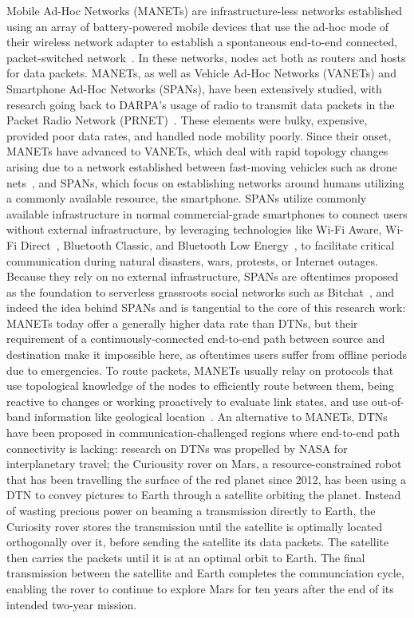Mobile Ad-Hoc Networks (MANETs) are infrastructure-less networks established using an array of battery-powered mobile devices that use the ad-hoc mode of their wireless network adapter to establish a spontaneous end-to-end connected, packet-switched network~\cite{Liu2026, Kindt2018}.
In these networks, nodes act both as routers and hosts for data packets.
MANETs, as well as Vehicle Ad-Hoc Networks (VANETs) and Smartphone Ad-Hoc Networks (SPANs), have been extensively studied, with research going back to DARPA's usage of radio to transmit data packets in the Packet Radio Network (PRNET)~\cite{Stotts2008}. These elements were bulky, expensive, provided poor data rates, and handled node mobility poorly.
Since their onset, MANETs have advanced to VANETs, which deal with rapid topology changes arising due to a network established between fast-moving vehicles such as drone nets~\cite{Liu2026}, and SPANs, which focus on establishing networks around humans utilizing a commonly available resource, the smartphone.
SPANs utilize commonly available infrastructure in normal commercial-grade smartphones to connect users without external infrastructure, by leveraging technologies like Wi-Fi Aware, Wi-Fi Direct~\cite{wifi-aware}, Bluetooth Classic, and Bluetooth Low Energy~\cite{bt-spec}, to facilitate critical communication during natural disasters, wars, protests, or Internet outages.
Because they rely on no external infrastructure, SPANs are oftentimes proposed as the foundation to serverless grassroots social networks such as Bitchat~\cite{bitchat}, and indeed the idea behind SPANs and is tangential to the core of this research work: MANETs today offer a generally higher data rate than DTNs, but their requirement of a continuously-connected end-to-end path between source and destination make it impossible here, as oftentimes users suffer from offline periods due to emergencies.
To route packets, MANETs usually relay on protocols that use topological knowledge of the nodes to efficiently route between them, being reactive to changes or working proactively to evaluate link states, and use out-of-band information like geological location~\cite{CMB-MANET}.
An alternative to MANETs, DTNs have been proposed in communication-challenged regions where end-to-end path connectivity is lacking: research on DTNs was propelled by NASA for interplanetary travel; the Curiousity rover on Mars, a resource-constrained robot that has been travelling the surface of the red planet since 2012, has been using a DTN to convey pictures to Earth through a satellite orbiting the planet. Instead of wasting precious power on beaming a transmission directly to Earth, the Curiosity rover stores the transmission until the satellite is optimally located orthogonally over it, before sending the satellite its data packets. The satellite then carries the packets until it is at an optimal orbit to Earth. The final transmission between the satellite and Earth completes the communciation cycle, enabling the rover to continue to explore Mars for ten years after the end of its intended two-year mission.
